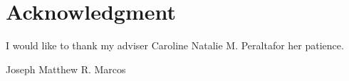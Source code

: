 \documentclass[journal]{./IEEE/IEEEtran}
\newcommand{\ADVISEE}{Joseph Matthew R. Marcos}
\newcommand{\ADVISER}{Caroline Natalie M. Peralta}
\begin{document}


\newpage
\section*{Acknowledgment}
I would like to thank my adviser \ADVISER for her patience.

\begin{biography}{\ADVISEE}
\end{biography}


\newpage
% 



\newpage
\appendices
\end{document}
